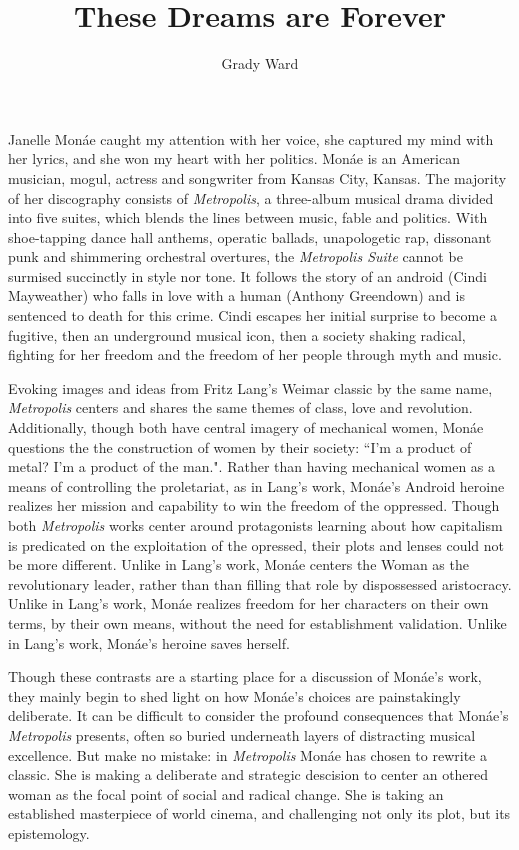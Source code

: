 \documentclass[11pt]{amsart}
\title{These Dreams are Forever}
\author{Grady Ward}
\date{}
\begin{document}
\maketitle

Janelle Mon\'ae caught my attention with her voice, she captured my mind with her lyrics, and she won my heart with her politics.
Mon\'ae is an American musician, mogul, actress and songwriter from Kansas City, Kansas.
The majority of her discography consists of \emph{Metropolis}, a three-album musical drama divided into five suites, which blends the lines between music, fable and politics.
With shoe-tapping dance hall anthems, operatic ballads, unapologetic rap, dissonant punk and shimmering orchestral overtures, the \emph{Metropolis Suite} cannot be surmised succinctly in style nor tone.
It follows the story of an android (Cindi Mayweather) who falls in love with a human (Anthony Greendown) and is sentenced to death for this crime\cite{wolfmasters}.
Cindi escapes her initial surprise to become a fugitive\cite{manymoons}, then an underground musical icon\cite{favoritefugitive}, then a society shaking radical\cite{fiveseveneighttwoone}, fighting for her freedom and the freedom of her people through myth and music.

Evoking images and ideas from Fritz Lang's Weimar classic by the same name, \emph{Metropolis} centers and shares the same themes of class, love and revolution\cite{metropolis}.
Additionally, though both have central imagery of mechanical women, Mon\'ae questions the the construction of women by their society: ``I'm a product of metal? I'm a product of the man."\cite{happyhunting}. 
Rather than having mechanical women as a means of controlling the proletariat, as in Lang's work\cite{metropolis}, Mon\'ae's Android heroine realizes her mission and capability to win the freedom of the oppressed.
Though both \emph{Metropolis} works center around protagonists learning about how capitalism is predicated on the exploitation of the opressed, their plots and lenses could not be more different.
Unlike in Lang's work, Mon\'ae centers the Woman as the revolutionary leader, rather than than filling that role by dispossessed aristocracy.
Unlike in Lang's work, Mon\'ae realizes freedom for her characters on their own terms, by their own means, without the need for establishment validation.
Unlike in Lang's work, Mon\'ae's heroine saves herself.

Though these contrasts are a starting place for a discussion of Mon\'ae's work, they mainly begin to shed light on how Mon\'ae's choices are painstakingly deliberate.
It can be difficult to consider the profound consequences that Mon\'ae's \emph{Metropolis} presents, often so buried underneath layers of distracting musical excellence.
But make no mistake: in \emph{Metropolis} Mon\'ae has chosen to rewrite a classic.
She is making a deliberate and strategic descision to center an othered woman as the focal point of social and radical change.
She is taking an established masterpiece of world cinema, and challenging not only its plot, but its epistemology.
\end{document}
